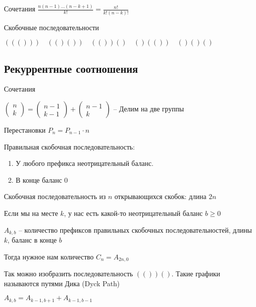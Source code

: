 \documentclass{book}
\theoremstyle{definition}
\begin{document}
Сочетания $\frac{n(n-1)\ldots(n-k+1)}{k!} = \frac{n!}{k!(n-k)!}$ 

Скобочные последовательности 

$((( )))\quad (( )( ))\quad (( ))( )\quad ( )(( ))\quad ( )( )( )$

\subsection{Рекуррентные соотношения}

Сочетания

$\begin{pmatrix} n\\k \end{pmatrix}  = \begin{pmatrix} n-1\\k-1 \end{pmatrix}  + \begin{pmatrix} n-1\\k \end{pmatrix} $ -- Делим на две группы

Перестановки $P_n = P_{n-1}\cdot n$

Правильная скобочная последовательность: 
\begin{enumerate}
    \item У любого префикса неотрицательный баланс. 
    \item В конце баланс $0$
\end{enumerate}

Скобочная последовательность из $n$ открывающихся скобок: длина  $2n$

Если мы на месте  $k$, у нас есть какой-то неотрицательный баланс  $b\geqslant 0$

$A_{k,b}$ -- количество префиксов правильных скобочных последовательностей, длины  $k$, баланс в конце $b$

Тогда нужное нам количество  $C_n = A_{2n, 0}$


Так можно изобразить последовательность $(( ))( )$. Такие графики называются путями Дика (Dyck Path)

$A_{k,b} = A_{k-1,b+1} + A_{k-1, b-1}$
\end{document}
